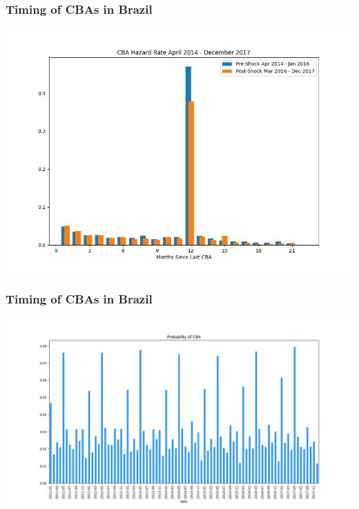 \documentclass{beamer}
\begin{document}
\begin{frame}
\frametitle{Timing of CBAs in Brazil}
		\begin{center}
		\includegraphics[scale=.45]{tables-figures/cba_hazard.png}
		\end{center}
\end{frame}

\begin{frame}
\frametitle{Timing of CBAs in Brazil}
		\centering
		\includegraphics[scale=.3]{tables-figures/cba_probability.png}
\end{frame}
\end{document}

